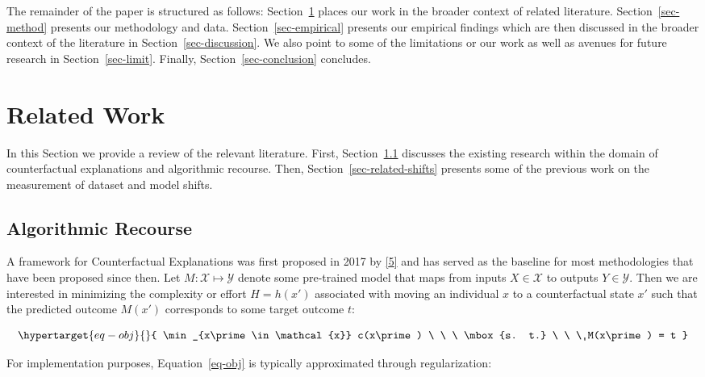 \documentclass[
  conference]{IEEEtran}
\begin{document}
The remainder of the paper is structured as follows:
Section~\ref{sec-related} places our work in the broader context of
related literature. Section~\ref{sec-method} presents our methodology
and data. Section~\ref{sec-empirical} presents our empirical findings
which are then discussed in the broader context of the literature in
Section~\ref{sec-discussion}. We also point to some of the limitations
or our work as well as avenues for future research in
Section~\ref{sec-limit}. Finally, Section~\ref{sec-conclusion}
concludes.

\hypertarget{sec-related}{%
\section{Related Work}\label{sec-related}}

In this Section we provide a review of the relevant literature. First,
Section~\ref{sec-related-recourse} discusses the existing research
within the domain of counterfactual explanations and algorithmic
recourse. Then, Section~\ref{sec-related-shifts} presents some of the
previous work on the measurement of dataset and model shifts.

\hypertarget{sec-related-recourse}{%
\subsection{Algorithmic Recourse}\label{sec-related-recourse}}

A framework for Counterfactual Explanations was first proposed in 2017
by \protect\hyperlink{ref-wachter2017counterfactual}{{[}5{]}} and has
served as the baseline for most methodologies that have been proposed
since then. Let \(M: \mathcal{X} \mapsto \mathcal{Y}\) denote some
pre-trained model that maps from inputs \(X \in \mathcal{X}\) to outputs
\(Y \in \mathcal{Y}\). Then we are interested in minimizing the
complexity or effort \(H=h(x\prime)\) associated with moving an
individual \(x\) to a counterfactual state \(x\prime\) such that the
predicted outcome \(M(x\prime)\) corresponds to some target outcome
\(t\):

\begin{equation}\protect\hypertarget{eq-obj}{}{
\min_{x\prime \in \mathcal{x}} c(x\prime) \ \ \ \mbox{s. t.} \ \ \ M(x\prime) = t
}\label{eq-obj}\end{equation}

For implementation purposes, Equation~\ref{eq-obj} is typically
approximated through regularization:
\end{document}
